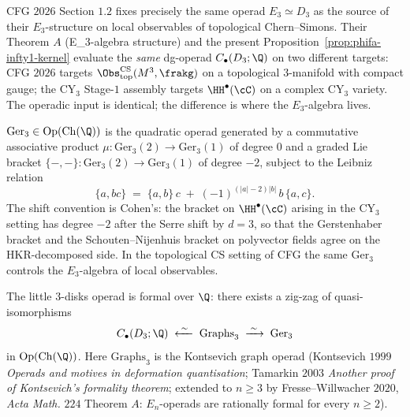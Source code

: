 \begin{remark}
\label{rem:cfg-2026-d3-little-disks}
CFG $2026$ Section $1.2$ fixes precisely the same operad
$E_3 \simeq D_3$ as the source of their $E_3$-structure on local
observables of topological Chern--Simons. Their Theorem $A$ (E_3$
$-algebra structure) and the present Proposition~\ref{prop:phifa-infty1-kernel}
evaluate the \emph{same} dg-operad $C_\bullet(D_3; \Q)$ on two
different targets: CFG $2026$ targets $\Obs^{\mathrm{CS}}_{\mathrm{top}}
(M^3, \frakg)$ on a topological $3$-manifold with compact gauge;
the CY$_3$ Stage-$1$ assembly targets $\HH^\bullet(\cC)$ on a complex
CY$_3$ variety. The operadic input is identical; the difference is
where the $E_3$-algebra lives.
\end{remark}

\begin{definition}
\label{def:gerstenhaber-shift-minus-2}
\ClaimStatusDefinitional
$\mathrm{Ger}_3 \in \mathrm{Op}(\mathrm{Ch}(\Q))$ is the quadratic operad
generated by a commutative associative product
$\mu \colon \mathrm{Ger}_3(2) \to \mathrm{Ger}_3(1)$ of degree $0$ and a graded Lie
bracket $\{-, -\} \colon \mathrm{Ger}_3(2) \to \mathrm{Ger}_3(1)$ of degree $-2$,
subject to the Leibniz relation
\[
 \{a, bc\} \;=\; \{a, b\}\, c \;+\; (-1)^{(|a| - 2)|b|}\, b\, \{a, c\}.
\]
The shift convention is Cohen's: the bracket on $\HH^\bullet(\cC)$
arising in the CY$_3$ setting has degree $-2$ after the Serre shift by
$d = 3$, so that the Gerstenhaber bracket and the Schouten--Nijenhuis
bracket on polyvector fields agree on the HKR-decomposed side. In the
topological CS setting of CFG the same $\mathrm{Ger}_3$ controls the $E_3$-algebra
of local observables.
\end{definition}

\begin{proposition}
\label{prop:e3-formality-question}
\ClaimStatusTheorem
The little $3$-disks operad is formal over $\Q$: there exists a
zig-zag of quasi-isomorphisms
\[
 C_\bullet(D_3; \Q) \;\xleftarrow{\;\sim\;}\; \mathrm{Graphs}_3 \;\xrightarrow{\;\sim\;}\; \mathrm{Ger}_3
\]
in $\mathrm{Op}(\mathrm{Ch}(\Q))$. Here $\mathrm{Graphs}_3$ is the
Kontsevich graph operad (Kontsevich $1999$
\textit{Operads and motives in deformation quantisation}; Tamarkin
$2003$ \textit{Another proof of Kontsevich's formality theorem}; extended
to $n \geq 3$ by Fresse--Willwacher $2020$, \textit{Acta Math.} $224$
Theorem $A$: $E_n$-operads are rationally formal for every $n \geq 2$).
\end{proposition}

